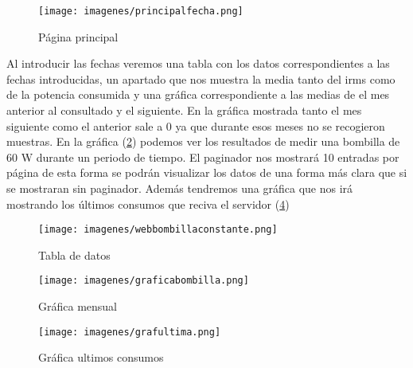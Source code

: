 \begin{figure}[H]
	\centering
	\texttt{[image: imagenes/principalfecha.png]}
	\caption{Página principal}
	\label{fig:principalweb}
\end{figure}

Al introducir las fechas veremos una tabla con los datos correspondientes a las fechas introducidas, un apartado que nos muestra la media tanto del irms como de la potencia consumida y una gráfica correspondiente a las medias de el mes anterior al consultado y el siguiente. En la gráfica mostrada tanto el mes siguiente como el anterior sale a 0 ya que durante esos meses no se recogieron muestras. En la gráfica (\ref{fig:tablaconsumos}) podemos ver los resultados de medir una bombilla de 60 W durante un periodo de tiempo. El paginador nos mostrará 10 entradas por página de esta forma se podrán visualizar los datos de una forma más clara que si se mostraran sin paginador. Además tendremos una gráfica que nos irá mostrando los últimos consumos que reciva el servidor (\ref{fig:grafultimos})

\begin{figure}[H]
	\centering
	\texttt{[image: imagenes/webbombillaconstante.png]}
	\caption{Tabla de datos}
	\label{fig:tablaconsumos}
\end{figure}

\begin{figure}[H]
	\centering
	\texttt{[image: imagenes/graficabombilla.png]}
	\caption{Gráfica mensual}
	\label{fig:grafmensual}
\end{figure}

\begin{figure}[H]
\centering
\texttt{[image: imagenes/grafultima.png]}
\caption{Gráfica ultimos consumos}
\label{fig:grafultimos}
\end{figure}

